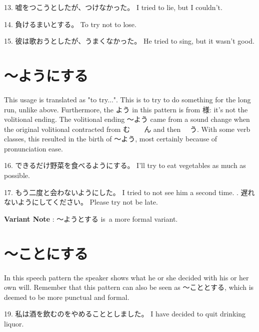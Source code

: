 \par{13. 嘘をつこうとしたが、つけなかった。 \hfill\break
I tried to lie, but I couldn't. }

\par{14. 負けるまいとする。 \hfill\break
To try not to lose. }

\par{15. 彼は歌おうとしたが、うまくなかった。 \hfill\break
He tried to sing, but it wasn't good. }
      
\section{～ようにする}
 
\par{ This usage is translated as "to try\dothyp{}\dothyp{}\dothyp{}". This is to try to do something for the long run, unlike above. Furthermore, the よう in this pattern is from 様: it's not the volitional ending. The volitional ending ～よう came from a sound change when the original volitional contracted from む　\textrightarrow 　ん and then \textrightarrow 　う. With some verb classes, this resulted in the birth of ～よう, most certainly because of pronunciation ease. }

\par{16. できるだけ野菜を食べるようにする。 \hfill\break
I'll try to eat vegetables as much as possible. }

\par{17. もう二度と会わないようにした。 \hfill\break
I tried to not see him a second time. \hfill\break
\hfill{}. 遅れないようにしてください。 \hfill\break
Please try not be late. }

\par{\textbf{Variant Note }: ～ようとする is a more formal variant. }
      
\section{～ことにする}
 
\par{ In this speech pattern the speaker shows what he or she decided with his or her own will. Remember that this pattern can also be seen as ～こととする, which is deemed to be more punctual and formal. }

\par{19. 私は酒を飲むのをやめることとしました。 \hfill\break
I have decided to quit drinking liquor. }


